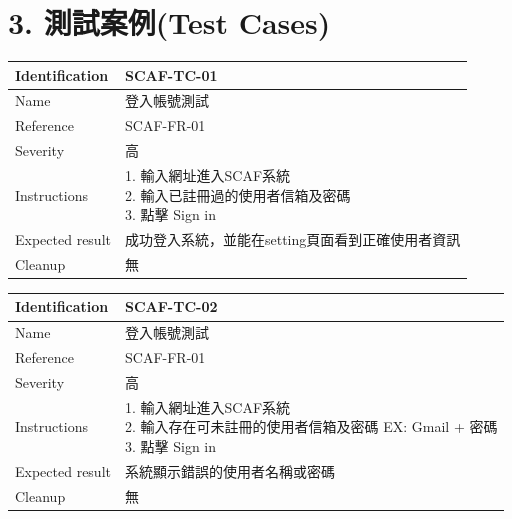 \documentclass{report}
\begin{document}
\section*{3. 測試案例(Test Cases)}
\begin{tabularx}{\textwidth}{
  |p{}%
  |p{}|%
  }
  \hline
  \centering Identification &  SCAF-TC-01 \\
  \hline
  \centering Name & 登入帳號測試 \\
  \hline
  \centering Reference & SCAF-FR-01 \\
  \hline
  \centering Severity & 高 \\
  \hline
  \centering Instructions & 
  \makecell[l]{
    1. 輸入網址進入SCAF系統 \\
    2. 輸入已註冊過的使用者信箱及密碼 \\
    3. 點擊 Sign in
  }\\
  \hline
  \centering Expected result & 成功登入系統，並能在setting頁面看到正確使用者資訊 \\
  \hline
  \centering Cleanup & 無 \\
  \hline
\end{tabularx}
\newline\newline
\begin{tabularx}{\textwidth}{
  |p{}%
  |p{}|%
  }
  \hline
  \centering Identification &  SCAF-TC-02 \\
  \hline
  \centering Name & 登入帳號測試 \\
  \hline
  \centering Reference & SCAF-FR-01 \\
  \hline
  \centering Severity & 高 \\
  \hline
  \centering Instructions & 
  \makecell[l]{
    1. 輸入網址進入SCAF系統 \\
    2. 輸入存在可未註冊的使用者信箱及密碼 EX: Gmail + 密碼 \\
    3. 點擊 Sign in
  }\\
  \hline
  \centering Expected result & 系統顯示錯誤的使用者名稱或密碼 \\
  \hline
  \centering Cleanup & 無 \\
  \hline
\end{tabularx}
\\
\newline
\\
\end{document}
